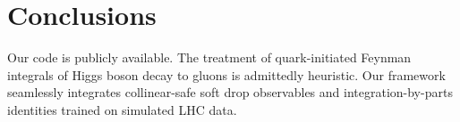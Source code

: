 \section{Conclusions}\label{sec:conclusions}

Our code is publicly available. The treatment of quark-initiated Feynman
integrals of Higgs boson decay to gluons is admittedly heuristic. Our
framework seamlessly integrates collinear-safe soft drop observables and
integration-by-parts identities trained on simulated LHC data.


